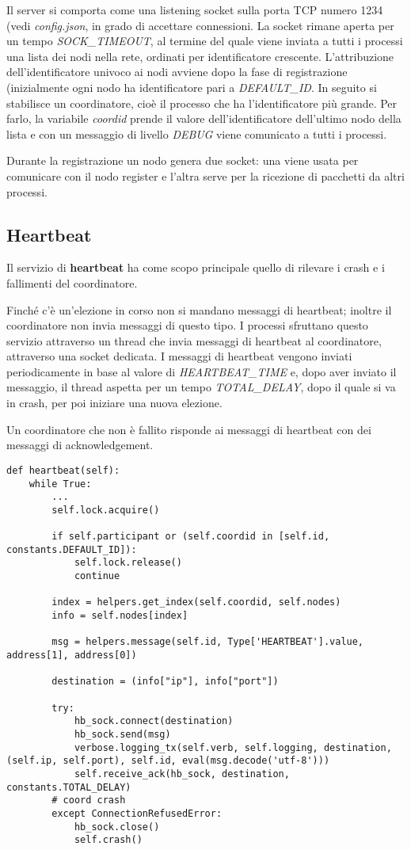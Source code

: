 \documentclass[conference]{IEEEtran}
\begin{document}
Il server si comporta come una listening socket sulla porta TCP numero 1234 (vedi \textit{config.json}, in grado di accettare connessioni.
La socket rimane aperta per un tempo \textit{SOCK\_TIMEOUT}, al termine del quale viene inviata a tutti i processi una lista dei nodi nella rete, ordinati per identificatore crescente.
L'attribuzione dell'identificatore univoco ai nodi avviene dopo la fase di registrazione (inizialmente ogni nodo ha identificatore pari a \textit{DEFAULT\_ID}.
In seguito si stabilisce un coordinatore, cioè il processo che ha l'identificatore più grande. Per farlo, la variabile \textit{coordid} prende il valore dell'identificatore dell'ultimo nodo della lista e con un messaggio di livello \textit{DEBUG} viene comunicato a tutti i processi.

Durante la registrazione un nodo genera due socket: una viene usata per comunicare con il nodo register e l'altra serve per la ricezione di pacchetti da altri processi.


\subsection{Heartbeat}\label{heartbeat}

Il servizio di \textbf{heartbeat} ha come scopo principale quello di rilevare i crash e i fallimenti del coordinatore.

Finché c'è un'elezione in corso non si mandano messaggi di heartbeat; inoltre il coordinatore non invia messaggi di questo tipo.
I processi sfruttano questo servizio attraverso un thread che invia messaggi di heartbeat al coordinatore, attraverso una socket dedicata.
I messaggi di heartbeat vengono inviati periodicamente in base al valore di \textit{HEARTBEAT\_TIME} e, dopo aver inviato il messaggio, il thread aspetta per un tempo \textit{TOTAL\_DELAY}, dopo il quale si va in crash, per poi iniziare una nuova elezione.

Un coordinatore che non è fallito risponde ai messaggi di heartbeat con dei messaggi di acknowledgement.

\begin{lstlisting}
def heartbeat(self):
    while True:
        ...
        self.lock.acquire()

        if self.participant or (self.coordid in [self.id, constants.DEFAULT_ID]):
            self.lock.release()
            continue

        index = helpers.get_index(self.coordid, self.nodes)
        info = self.nodes[index]

        msg = helpers.message(self.id, Type['HEARTBEAT'].value, address[1], address[0])

        destination = (info["ip"], info["port"])

        try:
            hb_sock.connect(destination)
            hb_sock.send(msg)
            verbose.logging_tx(self.verb, self.logging, destination, (self.ip, self.port), self.id, eval(msg.decode('utf-8')))
            self.receive_ack(hb_sock, destination, constants.TOTAL_DELAY)
        # coord crash
        except ConnectionRefusedError:
            hb_sock.close()
            self.crash()
\end{lstlisting}
\end{document}
